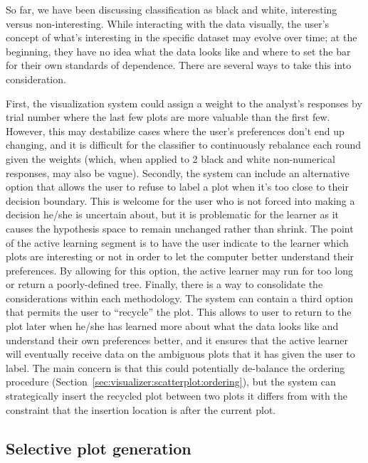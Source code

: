 So far, we have been discussing classification as black and white, interesting versus non-interesting. While interacting with the data visually, the user's concept of what's interesting in the specific dataset may evolve over time; at the beginning, they have no idea what the data looks like and where to set the bar for their own standards of dependence. There are several ways to take this into consideration. 

First, the visualization system could assign a weight to the analyst's responses by trial number where the last few plots are more valuable than the first few. However, this may destabilize cases where the user's preferences don’t end up changing, and it is difficult for the classifier to continuously rebalance each round given the weights (which, when applied to 2 black and white non-numerical responses, may also be vague). Secondly, the system can include an alternative option that allows the user to refuse to label a plot when it's too close to their decision boundary. This is welcome for the user who is not forced into making a decision he/she is uncertain about, but it is problematic for the learner as it causes the hypothesis space to remain unchanged rather than shrink. The point of the active learning segment is to have the user indicate to the learner which plots are interesting or not in order to let the computer better understand their preferences. By allowing for this option, the active learner may run for too long or return a poorly-defined tree. Finally, there is a way to consolidate the considerations within each methodology. The system can contain a third option that permits the user to ``recycle'' the plot. This allows to user to return to the plot later when he/she has learned more about what the data looks like and understand their own preferences better, and it ensures that the active learner will eventually receive data on the ambiguous plots that it has given the user to label. The main concern is that this could potentially de-balance the ordering procedure (Section~\ref{sec:visualizer:scatterplot:ordering}), but the system can strategically insert the recycled plot between two plots it differs from with the constraint that the insertion location is after the current plot.

\subsection{Selective plot generation}
\label{sec:visualizer:al:alplotgeneration}

